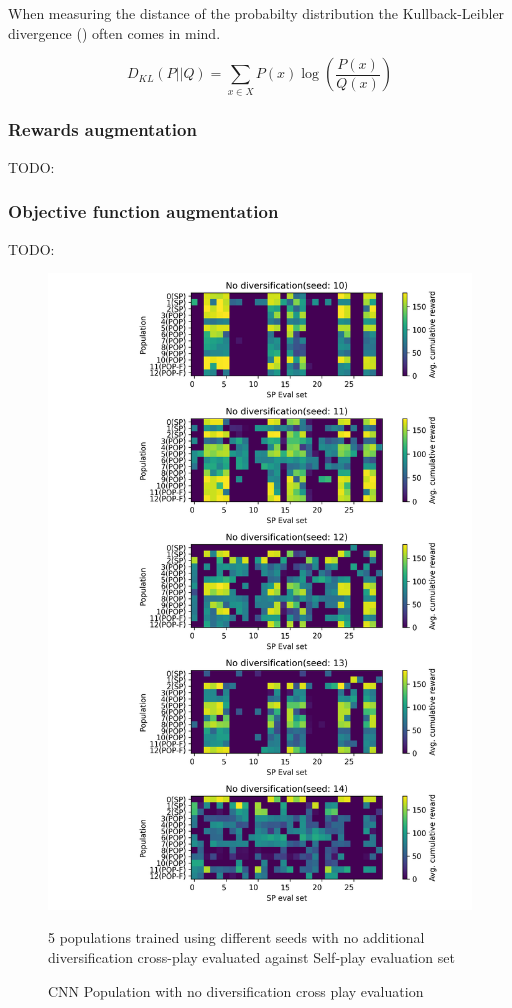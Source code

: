 When measuring the distance of the probabilty distribution the Kullback-Leibler divergence (\cite{KLDivergence}) often comes in mind.

\[
    D_{KL}(P||Q) = \sum_{x \in X}P(x)\log\left(\frac{P(x)}{Q(x)}\right)
\]


\subsubsection{Rewards augmentation}
TODO:
\subsubsection{Objective function augmentation}
TODO:


\begin{figure}[!ht]
    \centering
    \includegraphics*[width=14cm]{../img/Forced_coordination_CNN_POP_NO_DIF(2).png}

    \caption{CNN Population with no diversification cross play evaluation}
    \label{CNNPopNoDiffBestInitFixation}
    \medskip
    \small 
    5 populations trained using different seeds with no additional diversification cross-play evaluated against Self-play evaluation set

\end{figure}

